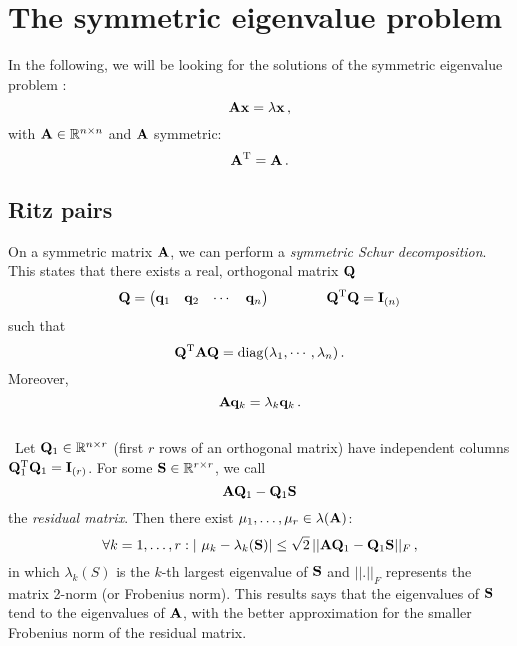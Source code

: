 \section{The symmetric eigenvalue problem}
    In the following, we will be looking for the solutions of the symmetric eigenvalue problem \cite{Golub2013}:
    \begin{equation}
        \vb{A} \vb{x} = \lambda \vb{x} \thinspace ,
    \end{equation}
    with $\vb{A} \in \mathbb{R}^{n \times n}$ and $\vb{A}$ symmetric:
    \begin{equation}
        \vb{A}^\text{T} = \vb{A} \thinspace .
    \end{equation}

    \subsection{Ritz pairs} \label{sec:ritz}
        On a symmetric matrix $\vb{A}$, we can perform a \emph{symmetric Schur decomposition}. This states that there exists a real, orthogonal matrix $\vb{Q}$
        \begin{equation}
            \vb{Q} = \begin{pmatrix} \vb{q}_1 & \vb{q}_2 & \cdots & \vb{q}_n \end{pmatrix} \qquad \qquad \vb{Q}^\text{T} \vb{Q} = \vb{I}_{(n)}
        \end{equation}
        such that
        \begin{equation}
            \vb{Q}^\text{T} \vb{A} \vb{Q} = \operatorname{diag}(\lambda_1, \cdots, \lambda_n) \thinspace .
        \end{equation}
        Moreover,
        \begin{equation}
            \vb{A} \vb{q}_k = \lambda_k \vb{q}_k \thinspace .
        \end{equation}
        \\\
        Let $\vb{Q}_1 \in \mathbb{R}^{n \times r}$ (first $r$ rows of an orthogonal matrix) have independent columns $\vb{Q}_1^\text{T} \vb{Q}_1 = \vb{I}_{(r)}$. For some $\vb{S} \in \mathbb{R}^{r \times r}$, we call
        \begin{equation}
            \vb{A}\vb{Q}_1 - \vb{Q}_1 \vb{S}
        \end{equation}
        the \emph{residual matrix}. Then there exist $\mu_1, \dots, \mu_r \in \lambda(\vb{A})$:
        \begin{equation} \label{eq:mu_lambda_residue}
            \forall k=1, \dots, r: | \mu_k - \lambda_k(\vb{S})| \leq \sqrt{2} \thinspace || \vb{A}\vb{Q}_1 - \vb{Q}_1 \vb{S} ||_F \thinspace ,
        \end{equation}
        in which $\lambda_k(S)$ is the $k$-th largest eigenvalue of $\vb{S}$ and $||.||_F$ represents the matrix 2-norm (or Frobenius norm). This results says that the eigenvalues of $\vb{S}$ tend to the eigenvalues of $\vb{A}$, with the better approximation for the smaller Frobenius norm of the residual matrix.\\

